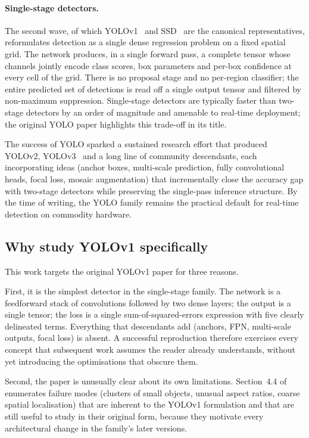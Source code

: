 \paragraph{Single-stage detectors.} The second wave, of which
YOLOv1~\citep{redmon2016you} and SSD~\citep{liu2016ssd} are the canonical
representatives, reformulates detection as a single dense regression problem
on a fixed spatial grid. The network produces, in a single forward pass,
a complete tensor whose channels jointly encode class scores, box
parameters and per-box confidence at every cell of the grid. There is no
proposal stage and no per-region classifier; the entire predicted set of
detections is read off a single output tensor and filtered by non-maximum
suppression. Single-stage detectors are typically faster than two-stage
detectors by an order of magnitude and amenable to real-time deployment;
the original YOLO paper highlights this trade-off in its title.

The success of YOLO sparked a sustained research effort that produced
YOLOv2, YOLOv3~\citep{redmon2018yolov3} and a long line of community
descendants, each incorporating ideas (anchor boxes, multi-scale prediction,
fully convolutional heads, focal loss, mosaic augmentation) that
incrementally close the accuracy gap with two-stage detectors while
preserving the single-pass inference structure. By the time of writing, the
YOLO family remains the practical default for real-time detection on commodity
hardware.

\subsection{Why study YOLOv1 specifically}
\label{sec:intro:why-yolov1}

This work targets the original YOLOv1 paper for three reasons.

First, it is the simplest detector in the single-stage family. The network
is a feedforward stack of convolutions followed by two dense layers; the
output is a single tensor; the loss is a single sum-of-squared-errors
expression with five clearly delineated terms. Everything that descendants
add (anchors, FPN, multi-scale outputs, focal loss) is absent. A successful
reproduction therefore exercises every concept that subsequent work assumes
the reader already understands, without yet introducing the optimisations
that obscure them.

Second, the paper is unusually clear about its own limitations. Section~4.4
of \citet{redmon2016you} enumerates failure modes (clusters of small objects,
unusual aspect ratios, coarse spatial localisation) that are inherent to
the YOLOv1 formulation and that are still useful to study in their original
form, because they motivate every architectural change in the family's later
versions.

